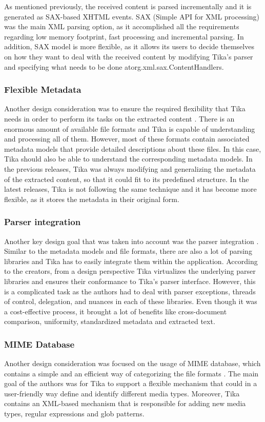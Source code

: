 \documentclass{article}
\begin{document}
As mentioned previously, the received content is parsed incrementally and it is generated as SAX-based XHTML events. SAX (Simple API for XML processing) was the main XML parsing option, as it accomplished all the requirements regarding low memory footprint, fast processing and incremental parsing. In addition, SAX model is more flexible, as it allows its users to decide themselves on how they want to deal with the received content by modifying Tika’s parser and specifying what needs to be done atorg.xml.sax.ContentHandlers.

\subsubsection{Flexible Metadata}
Another design consideration was to ensure the required flexibility that Tika needs in order to perform its tasks on the extracted content \citep{tika_in_action}. There is an enormous amount of available file formats and Tika is capable of understanding and processing all of them. However, most of these formats contain associated metadata models that provide detailed descriptions about these files. In this case, Tika should also be able to understand the corresponding metadata models. In the previous releases, Tika was always modifying and generalizing the metadata of the extracted content, so that it could fit to its predefined structure. In the latest releases, Tika is not following the same technique and it has become more flexible, as it stores the metadata in their original form.

\subsubsection{Parser integration}
Another key design goal that was taken into account was the parser integration \citep{tika_in_action}. Similar to the metadata models and file formats, there are also a lot of parsing libraries and Tika has to easily integrate them within the application. According to the creators, from a design perspective Tika virtualizes the underlying parser libraries and ensures their conformance to Tika’s parser interface. However, this is a complicated task as the authors had to deal with parser exceptions, threads of control, delegation, and nuances in each of these libraries. Even though it was a cost-effective process, it brought a lot of benefits like cross-document comparison, uniformity, standardized metadata and extracted text.

\subsubsection{MIME Database}
Another design consideration was focused on the usage of MIME database, which contains a simple and an efficient way of categorizing the file formats \citep{tika_in_action}. The main goal of the authors was for Tika to support a flexible mechanism that could in a user-friendly way define and identify different media types. Moreover, Tika contains an XML-based mechanism that is responsible for adding new media types, regular expressions and glob patterns.
\end{document}
